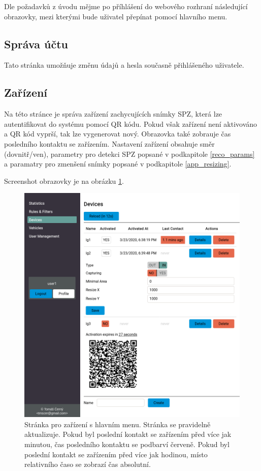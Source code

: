 \noindent
Dle požadavků z úvodu mějme po příhlášení do webového rozhraní následující obrazovky,
mezi kterými bude uživatel přepínat pomocí hlavního menu.

\subsection{Správa účtu}

\noindent
Tato stránka umožňuje změnu údajů a hesla současně přihlášeného uživatele.

\subsection{Zařízení}

\noindent
Na této stránce je správa zařízení zachycujících snímky SPZ, která lze autentifikovat do systému pomocí
QR kódu. Pokud však zařízení není aktivováno a QR kód vyprší, tak lze vygenerovat nový.
Obrazovka také zobrauje čas posledního kontaktu se zařízením.
Nastavení zařízení obsahuje směr (dovnitř/ven), parametry pro detekci SPZ popsané v podkapitole \ref{reco_params}
a paramatry pro zmenšení snímky popsané v podkapitole \ref{app_resizing}.

Screenshot obrazovky je na obrázku \ref{fig:page_devices}.

\begin{figure} \centering
  \includegraphics[width=145mm]{../img/page_devices.png}
  \caption[Stránka pro zařízení s hlavním menu.]{Stránka pro zařízení s hlavním menu. Stránka se
  pravidelně aktualizuje. Pokud byl poslední kontakt se zařízením před více jak minutou,
  čas posledního kontaktu se podbarví červeně. Pokud byl poslední kontakt se zařízením
  před více jak hodinou, místo relativního časo se zobrazí čas absolutní.}
  \label{fig:page_devices}
\end{figure}

